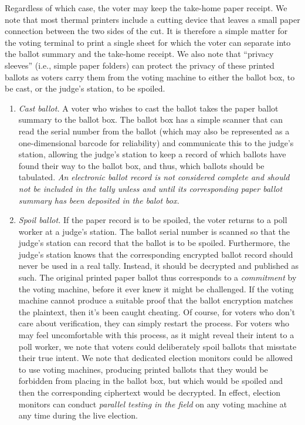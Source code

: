 \begin{enumerate}
 Regardless of which case, the voter may keep the take-home paper receipt.
 We note that most thermal printers include a cutting device that leaves a
 small paper connection between the two sides of the cut.
 It is therefore a simple matter for the voting terminal to print a single
 sheet for which the voter can separate into the ballot summary and the
 take-home receipt.
 We also note that ``privacy sleeves'' (i.e., simple paper folders) can protect the privacy of these printed ballots as voters carry them from the voting machine to either the ballot box, to be cast, or the judge's station, to be spoiled.

\begin{enumerate}
\item  {\em Cast ballot.}
A voter who wishes to cast the ballot takes the paper ballot summary to the ballot box.
The ballot box has a simple scanner that can read the serial number from the ballot
(which may also be represented as a one-dimensional barcode for reliability)
and communicate this to the judge's station, allowing the judge's station to keep a record of which ballots have found their way to the ballot box, and thus, which ballots should be tabulated. 
{\em An electronic ballot record is not considered complete and should not be
 included in the tally unless and until its corresponding paper ballot summary has
 been deposited in the balot box.}

\item {\em Spoil ballot.}
If the paper record is to be spoiled, the voter returns to a poll worker at a judge's station. 
The ballot serial number is scanned so that the judge's station can record that the ballot is to be spoiled. Furthermore, the judge's station knows that the corresponding encrypted ballot record should never be used in a real tally. Instead, it should be decrypted and published as such. The original printed paper ballot thus corresponds to a {\em commitment} by the voting machine, before it ever knew it might be challenged.
 If the voting machine cannot produce a suitable proof that the ballot encryption matches the plaintext,
 then it's been caught cheating.
 Of course, for voters who don't care about verification,
 they can simply restart the process.
 For voters who may feel uncomfortable with this process,
 as it might reveal their intent to a poll worker,
 we note that voters could deliberately spoil ballots that misstate their true intent. We note that dedicated election monitors could be allowed to use voting machines, producing printed ballots that they would be forbidden from placing in the ballot box, but which would be spoiled and then the corresponding ciphertext would be decrypted. In effect, election monitors can conduct {\em parallel testing in the field} on any voting machine at any time during the live election.



\end{enumerate}
\end{enumerate}

